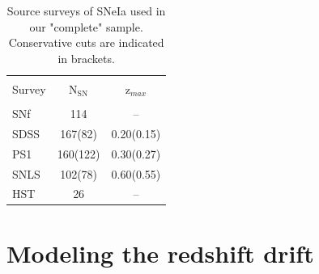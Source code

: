 \documentclass[]{aa} %
\newcommand{\mri}[1]{{\textcolor{red}{#1}}}
\begin{document}
\begin{table}
    \centering
    \caption{Source surveys of SNeIa used in our "complete" sample. Conservative
    cuts are indicated in brackets.}
    \label{tab:sample}
    \begin{tabular}{l c c}
    \hline\hline\\[-0.8em]
        Survey & N$_{\mathrm{SN}}$  & z$_{max}$ \\[0.15em]
        \hline\\[-0.8em]
        SNf & 114 & --\\[0.30em]
        SDSS & 167(82) & 0.20(0.15)\\[0.30em]
        PS1 & 160(122) & 0.30(0.27) \\[0.30em]        
        SNLS & 102(78) & 0.60(0.55)\\[0.30em]
        HST & 26 & --\\[0.30em]
        \hline
    \end{tabular}
\end{table}










\section{Modeling the redshift drift}
\label{sec:modeling}
\end{document}
